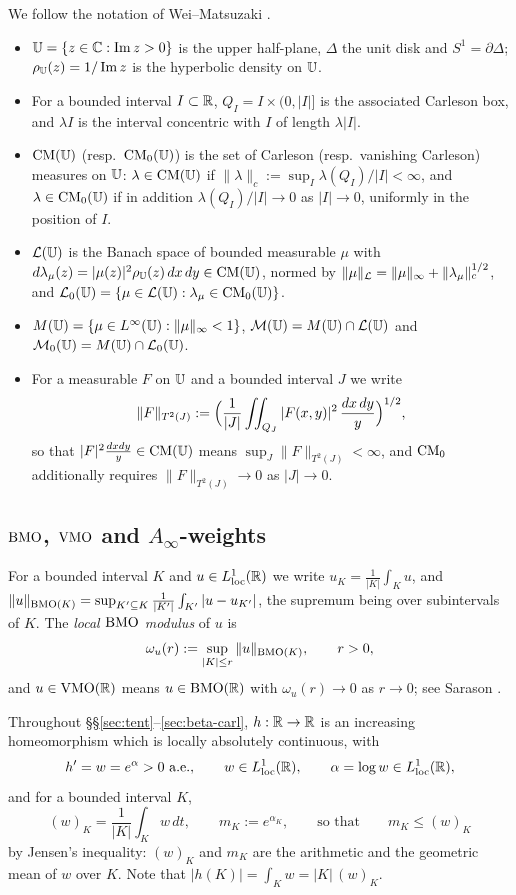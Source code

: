 We follow the notation of Wei--Matsuzaki \cite{WM}.
\begin{itemize}
	\item $\mathbb{U}=\{z\in\mathbb{C}:\operatorname{Im}z>0\}$ is the upper half-plane,
	$\Delta$ the unit disk and $S^1=\partial\Delta$;
	$\rho_{\mathbb{U}}(z)=1/\operatorname{Im}z$ is the hyperbolic density on $\mathbb{U}$.
	\item For a bounded interval $I\subset\mathbb{R}$, $Q_I=I\times(0,|I|]$ is the
	associated Carleson box, and $\lambda I$ is the interval concentric with $I$ of
	length $\lambda|I|$.
	\item $\mathrm{CM}(\mathbb{U})$ (resp.\ $\mathrm{CM}_0(\mathbb{U})$) is the set of Carleson (resp.\ vanishing
	Carleson) measures on $\mathbb{U}$: $\lambda\in\mathrm{CM}(\mathbb{U})$ if
	$\|\lambda\|_c:=\sup_I\lambda(Q_I)/|I|<\infty$, and $\lambda\in\mathrm{CM}_0(\mathbb{U})$ if in
	addition $\lambda(Q_I)/|I|\to0$ as $|I|\to0$, uniformly in the position of $I$.
	\item $\mathcal{L}(\mathbb{U})$ is the Banach space of bounded measurable $\mu$ with
	$d\lambda_\mu(z)=|\mu(z)|^2\rho_{\mathbb{U}}(z)\,dx\,dy\in\mathrm{CM}(\mathbb{U})$, normed by
	$\|\mu\|_{\mathcal{L}}=\|\mu\|_\infty+\|\lambda_\mu\|_c^{1/2}$, and
	$\mathcal{L}_0(\mathbb{U})=\{\mu\in\mathcal{L}(\mathbb{U}):\lambda_\mu\in\mathrm{CM}_0(\mathbb{U})\}$.
	\item $M(\mathbb{U})=\{\mu\in L^\infty(\mathbb{U}):\|\mu\|_\infty<1\}$,
	$\mathcal{M}(\mathbb{U})=M(\mathbb{U})\cap\mathcal{L}(\mathbb{U})$ and $\mathcal{M}_0(\mathbb{U})=M(\mathbb{U})\cap\mathcal{L}_0(\mathbb{U})$.
	\item For a measurable $F$ on $\mathbb{U}$ and a bounded interval $J$ we write
	\[
	\|F\|_{T^2(J)}:=\Bigl(\frac1{|J|}\iint_{Q_J}|F(x,y)|^2\,\frac{dx\,dy}{y}\Bigr)^{1/2},
	\]
	so that $|F|^2\frac{dxdy}{y}\in\mathrm{CM}(\mathbb{U})$ means $\sup_J\|F\|_{T^2(J)}<\infty$, and
	$\mathrm{CM}_0$ additionally requires $\|F\|_{T^2(J)}\to0$ as $|J|\to0$.
\end{itemize}

\subsection{\texorpdfstring{$\mathrm{BMO}$, $\mathrm{VMO}$ and $A_\infty$-weights}{BMO, VMO and A-infinity-weights}}\label{ss:weights}

For a bounded interval $K$ and $u\in L^1_{\mathrm{loc}}(\mathbb{R})$ we write
$u_K=\frac1{|K|}\int_Ku$, and
$\|u\|_{\mathrm{BMO}(K)}=\sup_{K'\subseteq K}\frac1{|K'|}\int_{K'}|u-u_{K'}|$, the
supremum being over subintervals of $K$. The \emph{local $\mathrm{BMO}$ modulus} of $u$
is
\[
\omega_u(r):=\sup_{|K|\le r}\|u\|_{\mathrm{BMO}(K)},\qquad r>0,
\]
and $u\in\mathrm{VMO}(\mathbb{R})$ means $u\in\mathrm{BMO}(\mathbb{R})$ with $\omega_u(r)\to0$ as $r\to0$; see
Sarason \cite{Sar}.

Throughout \S\S\ref{sec:tent}--\ref{sec:beta-carl}, $h:\mathbb{R}\to\mathbb{R}$ is an
increasing homeomorphism which is locally absolutely continuous, with
\[
h'=w=e^{\alpha}>0\ \text{a.e.},\qquad
w\in L^1_{\mathrm{loc}}(\mathbb{R}),\qquad \alpha=\log w\in L^1_{\mathrm{loc}}(\mathbb{R}),
\]
and for a bounded interval $K$,
\[
(w)_K=\frac1{|K|}\int_Kw\,dt,\qquad
m_K:=e^{\alpha_K},\qquad\text{so that}\qquad m_K\le(w)_K
\]
by Jensen's inequality: $(w)_K$ and $m_K$ are the arithmetic and the geometric
mean of $w$ over $K$. Note that $|h(K)|=\int_Kw=|K|\,(w)_K$.

